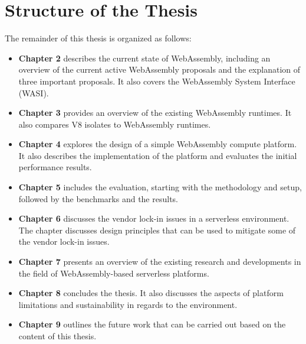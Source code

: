 \section{Structure of the Thesis}
\label{sec:structure-of-the-thesis}

The remainder of this thesis is organized as follows:
\begin{itemize}
  \item \textbf{Chapter 2} describes the current state of WebAssembly, including an overview of the current active WebAssembly proposals and the explanation of three important proposals. It also covers the WebAssembly System Interface (WASI).
  \item \textbf{Chapter 3} provides an overview of the existing WebAssembly runtimes. It also compares \gls{V8} isolates to WebAssembly runtimes.
  \item \textbf{Chapter 4} explores the design of a simple WebAssembly compute platform. It also describes the implementation of the platform and evaluates the initial performance results.
  \item \textbf{Chapter 5} includes the evaluation, starting with the methodology and setup, followed by the benchmarks and the results.
  \item \textbf{Chapter 6} discusses the vendor lock-in issues in a serverless environment. The chapter discusses design principles that can be used to mitigate some of the vendor lock-in issues.
  \item \textbf{Chapter 7} presents an overview of the existing research and developments in the field of WebAssembly-based serverless platforms.
  \item \textbf{Chapter 8} concludes the thesis. It also discusses the aspects of platform limitations and sustainability in regards to the environment.
  \item \textbf{Chapter 9} outlines the future work that can be carried out based on the content of this thesis.
\end{itemize}
